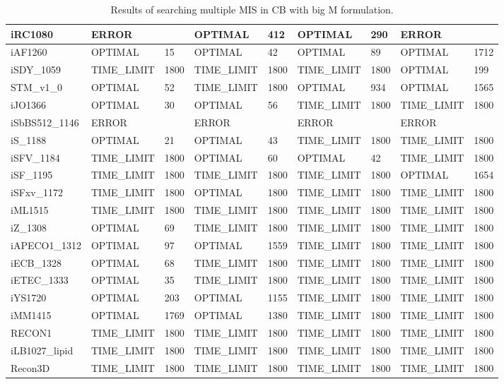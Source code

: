 \begin{table}[!ht]
\begin{tabular}{|l|l|l|l|l|l|l|l|l|}
        iRC1080 & ERROR & ~ & OPTIMAL & 412 & OPTIMAL & 290 & ERROR & ~ \\ \hline
        iAF1260 & OPTIMAL & 15 & OPTIMAL & 42 & OPTIMAL & 89 & OPTIMAL & 1712 \\ \hline
        iSDY\_1059 & TIME\_LIMIT & 1800 & TIME\_LIMIT & 1800 & TIME\_LIMIT & 1800 & OPTIMAL & 199 \\ \hline
        STM\_v1\_0 & OPTIMAL & 52 & TIME\_LIMIT & 1800 & OPTIMAL & 934 & OPTIMAL & 1565 \\ \hline
        iJO1366 & OPTIMAL & 30 & OPTIMAL & 56 & TIME\_LIMIT & 1800 & TIME\_LIMIT & 1800 \\ \hline
        iSbBS512\_1146 & ERROR & ~ & ERROR & ~ & ERROR & ~ & ERROR & ~ \\ \hline
        iS\_1188 & OPTIMAL & 21 & OPTIMAL & 43 & TIME\_LIMIT & 1800 & TIME\_LIMIT & 1800 \\ \hline
        iSFV\_1184 & TIME\_LIMIT & 1800 & OPTIMAL & 60 & OPTIMAL & 42 & TIME\_LIMIT & 1800 \\ \hline
        iSF\_1195 & TIME\_LIMIT & 1800 & TIME\_LIMIT & 1800 & TIME\_LIMIT & 1800 & OPTIMAL & 1654 \\ \hline
        iSFxv\_1172 & TIME\_LIMIT & 1800 & OPTIMAL & 1800 & TIME\_LIMIT & 1800 & TIME\_LIMIT & 1800 \\ \hline
        iML1515 & TIME\_LIMIT & 1800 & TIME\_LIMIT & 1800 & TIME\_LIMIT & 1800 & TIME\_LIMIT & 1800 \\ \hline
        iZ\_1308 & OPTIMAL & 69 & TIME\_LIMIT & 1800 & TIME\_LIMIT & 1800 & TIME\_LIMIT & 1800 \\ \hline
        iAPECO1\_1312 & OPTIMAL & 97 & OPTIMAL & 1559 & TIME\_LIMIT & 1800 & TIME\_LIMIT & 1800 \\ \hline
        iECB\_1328 & OPTIMAL & 68 & TIME\_LIMIT & 1800 & TIME\_LIMIT & 1800 & TIME\_LIMIT & 1800 \\ \hline
        iETEC\_1333 & OPTIMAL & 35 & TIME\_LIMIT & 1800 & TIME\_LIMIT & 1800 & TIME\_LIMIT & 1800 \\ \hline
        iYS1720 & OPTIMAL & 203 & OPTIMAL & 1155 & TIME\_LIMIT & 1800 & TIME\_LIMIT & 1800 \\ \hline
        iMM1415 & OPTIMAL & 1769 & OPTIMAL & 1380 & TIME\_LIMIT & 1800 & TIME\_LIMIT & 1800 \\ \hline
        RECON1 & TIME\_LIMIT & 1800 & TIME\_LIMIT & 1800 & TIME\_LIMIT & 1800 & TIME\_LIMIT & 1800 \\ \hline
        iLB1027\_lipid & TIME\_LIMIT & 1800 & TIME\_LIMIT & 1800 & TIME\_LIMIT & 1800 & TIME\_LIMIT & 1800 \\ \hline
        Recon3D & TIME\_LIMIT & 1800 & TIME\_LIMIT & 1800 & TIME\_LIMIT & 1800 & TIME\_LIMIT & 1800 \\ \hline
    \end{tabular}
    \caption{\label{Tab:multiple_mis_big_m} Results of searching multiple MIS in CB with big M formulation.}
\end{table}

